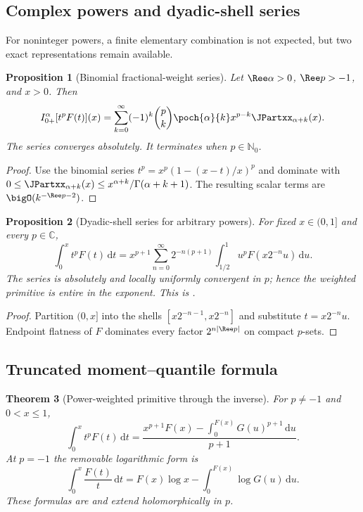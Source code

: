 \documentclass[11pt,oneside]{article}
\newtheorem{theorem}{Theorem}[section]
\newtheorem{proposition}[theorem]{Proposition}
\theoremstyle{definition}
\theoremstyle{remark}
\newcommand{\C}{\mathbb C}
\newcommand{\N}{\mathbb N}
\newcommand{\dd}{\,\mathrm d}
\newcommand{\1}{\mathbf 1}
\begin{document}
\subsection{Complex powers and dyadic-shell series}

For noninteger powers, a finite elementary combination is not expected, but two exact
representations remain available.

\begin{proposition}[Binomial fractional-weight series]
\label{p7:prop:complex-power-series}
Let $\Ree\alpha>0$, $\Ree p>-1$, and $x>0$.  Then
\begin{equation}
 I_{0+}^{\alpha}[t^pF(t)](x)
 =\sum_{k=0}^{\infty}(-1)^k\binom pk\poch{\alpha}{k}
 x^{p-k}\JPartxx_{\alpha+k}(x).
 \label{p7:eq:complex-power-series}
\end{equation}
The series converges absolutely.  It terminates when $p\in\N_0$.
\end{proposition}

\begin{proof}
Use the binomial series
$t^p=x^p(1-(x-t)/x)^p$ and dominate with
$0\le\JPartxx_{\alpha+k}(x)\le x^{\alpha+k}/\Gamma(\alpha+k+1)$.  The resulting scalar terms are
$\bigO(k^{-\Ree p-2})$.
\end{proof}

\begin{proposition}[Dyadic-shell series for arbitrary powers]
\label{p7:prop:dyadic-shell}
For fixed $x\in(0,1]$ and every $p\in\C$,
\begin{equation}
 \int_0^xt^pF(t)\dd t
 =x^{p+1}\sum_{n=0}^{\infty}2^{-n(p+1)}
 \int_{1/2}^{1}u^pF(x2^{-n}u)\dd u.
 \label{p7:eq:dyadic-shell}
\end{equation}
The series is absolutely and locally uniformly convergent in $p$; hence the weighted
primitive is entire in the exponent.  This is \statusproved.
\end{proposition}

\begin{proof}
Partition $(0,x]$ into the shells
$[x2^{-n-1},x2^{-n}]$ and substitute $t=x2^{-n}u$.  Endpoint flatness of $F$ dominates every
factor $2^{n|\Ree p|}$ on compact $p$-sets.
\end{proof}

\subsection{Truncated moment--quantile formula}

\begin{theorem}[Power-weighted primitive through the inverse]
\label{p7:thm:truncated-quantile}
For $p\ne-1$ and $0<x\le1$,
\begin{equation}
 \int_0^xt^pF(t)\dd t
 =\frac{x^{p+1}F(x)-\displaystyle\int_0^{F(x)}G(u)^{p+1}\dd u}{p+1}.
 \label{p7:eq:truncated-quantile}
\end{equation}
At $p=-1$ the removable logarithmic form is
\begin{equation}
 \int_0^x\frac{F(t)}t\dd t
 =F(x)\log x-\int_0^{F(x)}\log G(u)\dd u.
 \label{p7:eq:log-weight-F}
\end{equation}
These formulas are \statusproved{} and extend holomorphically in $p$.
\end{theorem}
\end{document}
